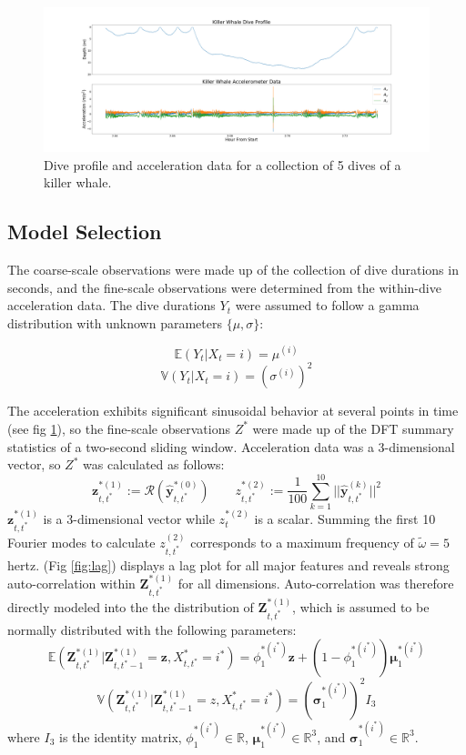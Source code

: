 \begin{figure}[ht]
	\centering
	\includegraphics[width=5in]{../Plots/raw_data_5_dives.png}
	\caption{Dive profile and acceleration data for a collection of 5 dives of a killer whale.}
	\label{fig:data_one_dive}
\end{figure}

\subsection{Model Selection}

The coarse-scale observations were made up of the collection of dive durations in seconds, and the fine-scale observations were determined from the within-dive acceleration data. The dive durations $Y_t$ were assumed to follow a gamma distribution with unknown parameters $\{\mu,\sigma\}$:

$$\mathbb{E}(Y_t|X_t = i) = \mu^{(i)}$$
$$\mathbb{V}(Y_t|X_t = i) = \left(\sigma^{(i)}\right)^2$$

The acceleration exhibits significant sinusoidal behavior at several points in time (see fig \ref{fig:data_one_dive}), so the fine-scale observations $Z^*$ were made up of the DFT summary statistics of a two-second sliding window. Acceleration data was a 3-dimensional vector, so $Z^*$ was calculated as follows:
%
$$\mathbf{z}_{t,t^*}^{*(1)} := \mathcal{R}\left(\hat{\mathbf{y}}^{*(0)}_{t,t^*}\right) \qquad z_{t,t^*}^{*(2)} := \frac{1}{100}\sum_{k=1}^{10}||\hat{\mathbf{y}}^{(k)}_{t,t^*}||^2$$
%
$\mathbf{z}_{t,t^*}^{*(1)}$ is a 3-dimensional vector while $z_t^{*(2)}$ is a scalar. Summing the first 10 Fourier modes to calculate $z^{(2)}_{t,t^*}$ corresponds to a maximum frequency of $\tilde \omega = 5$ hertz. (Fig \ref{fig:lag}) displays a lag plot for all major features and reveals strong auto-correlation within $\mathbf{Z}^{*(1)}_{t,t^*}$ for all dimensions. Auto-correlation was therefore directly modeled into the the distribution of $\mathbf{Z}^{*(1)}_{t,t^*}$, which is assumed to be normally distributed with the following parameters:
%
$$\mathbb{E}(\mathbf{Z}^{*(1)}_{t,t^*}|\mathbf{Z}^{*(1)}_{t,t^*-1} = \mathbf{z}, X^*_{t,t^*} = i^*) = \phi_1^{*(i^*)} \mathbf{z} + (1-\phi_1^{*(i^*)}) \mathbf{\mu}_1^{*(i^*)}$$
$$\mathbb{V}(\mathbf{Z}^{*(1)}_{t,t^*}|\mathbf{Z}^{*(1)}_{t,t^*-1} = z,X^*_{t,t^*} = i^*) = \left(\mathbf{\sigma}_1^{*(i^*)}\right)^2 I_3$$
%
where $I_3$ is the identity matrix, $\phi_1^{*(i^*)} \in \mathbb{R}$, $\mathbf{\mu}_1^{*(i^*)} \in \mathbb{R}^3$, and $\mathbf{\sigma}_1^{*(i^*)} \in \mathbb{R}^3$.

